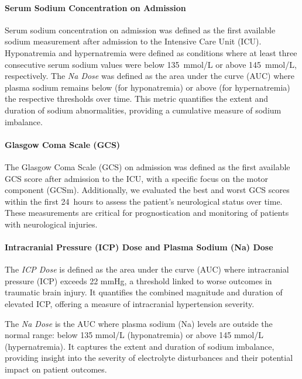 \paragraph{Serum Sodium Concentration on Admission}

Serum sodium concentration on admission was defined as the first available sodium measurement after admission to the Intensive Care Unit (ICU). Hyponatremia and hypernatremia were defined as conditions where at least three consecutive serum sodium values were below 135~mmol/L or above 145~mmol/L, respectively. The \textit{Na Dose} was defined as the area under the curve (AUC) where plasma sodium remains below (for hyponatremia) or above (for hypernatremia) the respective thresholds over time. This metric quantifies the extent and duration of sodium abnormalities, providing a cumulative measure of sodium imbalance.

\paragraph{Glasgow Coma Scale (GCS)}

The Glasgow Coma Scale (GCS) on admission was defined as the first available GCS score after admission to the ICU, with a specific focus on the motor component (GCSm). Additionally, we evaluated the best and worst GCS scores within the first 24~hours to assess the patient's neurological status over time. These measurements are critical for prognostication and monitoring of patients with neurological injuries.

\paragraph{Intracranial Pressure (ICP) Dose and Plasma Sodium (Na) Dose}
The \textit{ICP Dose} is defined as the area under the curve (AUC) where intracranial pressure (ICP) exceeds 22 mmHg, a threshold linked to worse outcomes in traumatic brain injury. It quantifies the combined magnitude and duration of elevated ICP, offering a measure of intracranial hypertension severity.

The \textit{Na Dose} is the AUC where plasma sodium (Na) levels are outside the normal range: below 135 mmol/L (hyponatremia) or above 145 mmol/L (hypernatremia). It captures the extent and duration of sodium imbalance, providing insight into the severity of electrolyte disturbances and their potential impact on patient outcomes.


